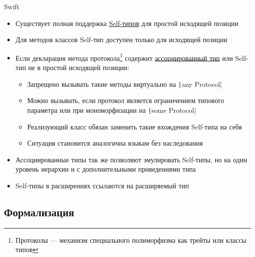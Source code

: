 \documentclass[handout,aspectratio=169,usenames,dvipsnames]{beamer}
\begin{document}
    \begin{frame}{Swift}
        \begin{itemize}
            \item Существует полная поддержка \href{https://docs.swift.org/swift-book/documentation/the-swift-programming-language/types/\#Self-Type}{\color{blue}Self-типов} для простой исходящей позиции
            \item Для методов классов Self-тип доступен только для исходящей позиции
            \item Если декларация метода протокола\footnote{Протоколы --- механизм специального полиморфизма как трейты или классы типов} содержит \href{https://docs.swift.org/swift-book/documentation/the-swift-programming-language/generics/\#Associated-Types}{\color{blue}ассоциированный тип} или Self-тип не в простой исходящей позиции:
            \begin{itemize}
                \item Запрещено вызывать такие методы виртуально на \texttt|any Protocol|
                \item Можно вызывать, если протокол является ограничением типового параметра или при мономорфизации на \texttt|some Protocol|
                \item Реализующий класс обязан заменить такие вхождения Self-типа на себя
                \item Ситуация становится аналогична языкам без наследования
            \end{itemize}
            \item Ассоциированные типы так же позволяют эмулировать Self-типы, но на один уровень иерархии и с дополнительными приведениями типа
            \item Self-типы в расширениях ссылаются на расширяемый тип
        \end{itemize}
    \end{frame}


    \subsection{Формализация}
\end{document}

